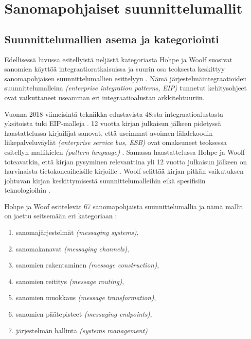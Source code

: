 \chapter{Sanomapohjaiset suunnittelumallit}

\section{Suunnittelumallien asema ja kategoriointi}
Edellisessä luvussa esitellyistä neljästä kategoriasta Hohpe ja Woolf suosivat sanomien käyttöä integraatioratkaisuissa ja suurin osa teoksesta keskittyy sanomapohjaisen suunnittelumallien esittelyyn \citep[sivu~76]{Hohpe2004}. Nämä järjestelmäintegraatioiden suunnittelumalleina \textit{(enterprise integration patterns, EIP)} tunnetut kehitysohjeet ovat vaikuttaneet useamman eri integraatioalustan arkkitehtuuriin. 

Vuonna 2018 viimeisintä tekniikka edustavista 48:sta integraatioalustasta yksitoista tuki EIP-malleja \citep{Freire2019}.
12 vuotta kirjan julkaisun jälkeen pidetyssä haastattelussa kirjailijat sanovat, että useimmat avoimen lähdekoodin liikepalveluväylät \textit{(enterprise service bus, ESB)} ovat omaksuneet teoksessa esitellyn mallikielen \textit{(pattern language)} \citep{Zimmermann2016}.
Samassa haastattelussa Hohpe ja Woolf toteavatkin, että kirjan pysyminen relevanttina yli 12 vuotta julkaisun jälkeen on harvinaista tietokoneaiheisille kirjoille \citep{Zimmermann2016}. Woolf selittää kirjan pitkän vaikutuksen johtuvan kirjan keskittymisestä suunnittelumalleihin eikä spesifisiin teknologioihin \citep{Zimmermann2016}.


Hohpe ja Woof esittelevät 67 sanomapohjaista suunnittelumallia ja nämä mallit on jaettu seitsemään eri kategoriaan \citep{Hohpe2004}:


\begin{enumerate}
   \item sanomajärjestelmät \textit{(messaging systems)},
   \item sanomakanavat \textit{(messaging channels)},
   \item sanomien rakentaminen \textit{(message construction)},
   \item sanomien reititys \textit{(message routing)},
   \item sanomien muokkaus \textit{(message transformation)},
   \item sanomien päätepisteet \textit{(messaging endpoints)},
   \item järjestelmän hallinta \textit{(systems management)}
\end{enumerate}

